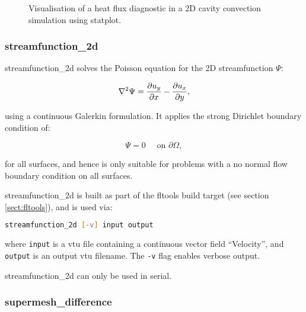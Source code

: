 \begin{figure}[ht]
  \centering
  \caption{Visualisation of a heat flux diagnostic in a 2D cavity convection
           simulation using statplot.}
  \label{fig:statplot}
\end{figure}


\subsubsection{streamfunction\_2d}
\label{sect:streamfunction_2d}

streamfunction\_2d solves the Poisson equation for the 2D streamfunction $\Psi$:

\begin{equation}
\nabla^2 \Psi = \ppx{u_y} - \ppx[y]{u_x},
\end{equation}

using a continuous Galerkin formulation. It applies the strong Dirichlet
boundary condition of:

\begin{equation}
\Psi = 0 \quad \text{ on } \partial \Omega,
\end{equation}

for all surfaces, and hence is only suitable for problems with a no normal flow boundary
condition on all surfaces.

streamfunction\_2d is built as part of the fltools build target (see section \ref{sect:fltools}),
and is used via:

\begin{lstlisting}[language = Bash]
streamfunction_2d [-v] input output
\end{lstlisting}

where \lstinline[language = Bash]+input+ is a vtu file containing a continuous vector
field ``Velocity'', and \lstinline[language = Bash]+output+ is an output vtu filename. The
\lstinline[language = Bash]+-v+ flag enables verbose output.

streamfunction\_2d can only be used in serial.


\subsubsection{supermesh\_difference}
\label{sect:supermesh_difference}

